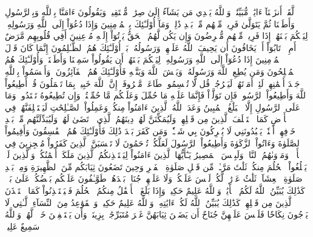 لَّقَدۡ أَنزَلۡنَآ ءَايَٰتٖ مُّبَيِّنَٰتٖۚ وَٱللَّهُ يَهۡدِي مَن يَشَآءُ إِلَىٰ صِرَٰطٖ مُّسۡتَقِيمٖ
وَيَقُولُونَ ءَامَنَّا بِٱللَّهِ وَبِٱلرَّسُولِ وَأَطَعۡنَا ثُمَّ يَتَوَلَّىٰ فَرِيقٞ مِّنۡهُم مِّنۢ بَعۡدِ ذَٰلِكَۚ وَمَآ أُوْلَـٰٓئِكَ بِٱلۡمُؤۡمِنِينَ
وَإِذَا دُعُوٓاْ إِلَى ٱللَّهِ وَرَسُولِهِۦ لِيَحۡكُمَ بَيۡنَهُمۡ إِذَا فَرِيقٞ مِّنۡهُم مُّعۡرِضُونَ
وَإِن يَكُن لَّهُمُ ٱلۡحَقُّ يَأۡتُوٓاْ إِلَيۡهِ مُذۡعِنِينَ
أَفِي قُلُوبِهِم مَّرَضٌ أَمِ ٱرۡتَابُوٓاْ أَمۡ يَخَافُونَ أَن يَحِيفَ ٱللَّهُ عَلَيۡهِمۡ وَرَسُولُهُۥۚ بَلۡ أُوْلَـٰٓئِكَ هُمُ ٱلظَّـٰلِمُونَ
إِنَّمَا كَانَ قَوۡلَ ٱلۡمُؤۡمِنِينَ إِذَا دُعُوٓاْ إِلَى ٱللَّهِ وَرَسُولِهِۦ لِيَحۡكُمَ بَيۡنَهُمۡ أَن يَقُولُواْ سَمِعۡنَا وَأَطَعۡنَاۚ وَأُوْلَـٰٓئِكَ هُمُ ٱلۡمُفۡلِحُونَ
وَمَن يُطِعِ ٱللَّهَ وَرَسُولَهُۥ وَيَخۡشَ ٱللَّهَ وَيَتَّقۡهِ فَأُوْلَـٰٓئِكَ هُمُ ٱلۡفَآئِزُونَ
۞وَأَقۡسَمُواْ بِٱللَّهِ جَهۡدَ أَيۡمَٰنِهِمۡ لَئِنۡ أَمَرۡتَهُمۡ لَيَخۡرُجُنَّۖ قُل لَّا تُقۡسِمُواْۖ طَاعَةٞ مَّعۡرُوفَةٌۚ إِنَّ ٱللَّهَ خَبِيرُۢ بِمَا تَعۡمَلُونَ
قُلۡ أَطِيعُواْ ٱللَّهَ وَأَطِيعُواْ ٱلرَّسُولَۖ فَإِن تَوَلَّوۡاْ فَإِنَّمَا عَلَيۡهِ مَا حُمِّلَ وَعَلَيۡكُم مَّا حُمِّلۡتُمۡۖ وَإِن تُطِيعُوهُ تَهۡتَدُواْۚ وَمَا عَلَى ٱلرَّسُولِ إِلَّا ٱلۡبَلَٰغُ ٱلۡمُبِينُ
وَعَدَ ٱللَّهُ ٱلَّذِينَ ءَامَنُواْ مِنكُمۡ وَعَمِلُواْ ٱلصَّـٰلِحَٰتِ لَيَسۡتَخۡلِفَنَّهُمۡ فِي ٱلۡأَرۡضِ كَمَا ٱسۡتَخۡلَفَ ٱلَّذِينَ مِن قَبۡلِهِمۡ وَلَيُمَكِّنَنَّ لَهُمۡ دِينَهُمُ ٱلَّذِي ٱرۡتَضَىٰ لَهُمۡ وَلَيُبَدِّلَنَّهُم مِّنۢ بَعۡدِ خَوۡفِهِمۡ أَمۡنٗاۚ يَعۡبُدُونَنِي لَا يُشۡرِكُونَ بِي شَيۡـٔٗاۚ وَمَن كَفَرَ بَعۡدَ ذَٰلِكَ فَأُوْلَـٰٓئِكَ هُمُ ٱلۡفَٰسِقُونَ
وَأَقِيمُواْ ٱلصَّلَوٰةَ وَءَاتُواْ ٱلزَّكَوٰةَ وَأَطِيعُواْ ٱلرَّسُولَ لَعَلَّكُمۡ تُرۡحَمُونَ
لَا تَحۡسَبَنَّ ٱلَّذِينَ كَفَرُواْ مُعۡجِزِينَ فِي ٱلۡأَرۡضِۚ وَمَأۡوَىٰهُمُ ٱلنَّارُۖ وَلَبِئۡسَ ٱلۡمَصِيرُ
يَـٰٓأَيُّهَا ٱلَّذِينَ ءَامَنُواْ لِيَسۡتَـٔۡذِنكُمُ ٱلَّذِينَ مَلَكَتۡ أَيۡمَٰنُكُمۡ وَٱلَّذِينَ لَمۡ يَبۡلُغُواْ ٱلۡحُلُمَ مِنكُمۡ ثَلَٰثَ مَرَّـٰتٖۚ مِّن قَبۡلِ صَلَوٰةِ ٱلۡفَجۡرِ وَحِينَ تَضَعُونَ ثِيَابَكُم مِّنَ ٱلظَّهِيرَةِ وَمِنۢ بَعۡدِ صَلَوٰةِ ٱلۡعِشَآءِۚ ثَلَٰثُ عَوۡرَٰتٖ لَّكُمۡۚ لَيۡسَ عَلَيۡكُمۡ وَلَا عَلَيۡهِمۡ جُنَاحُۢ بَعۡدَهُنَّۚ طَوَّـٰفُونَ عَلَيۡكُم بَعۡضُكُمۡ عَلَىٰ بَعۡضٖۚ كَذَٰلِكَ يُبَيِّنُ ٱللَّهُ لَكُمُ ٱلۡأٓيَٰتِۗ وَٱللَّهُ عَلِيمٌ حَكِيمٞ
وَإِذَا بَلَغَ ٱلۡأَطۡفَٰلُ مِنكُمُ ٱلۡحُلُمَ فَلۡيَسۡتَـٔۡذِنُواْ كَمَا ٱسۡتَـٔۡذَنَ ٱلَّذِينَ مِن قَبۡلِهِمۡۚ كَذَٰلِكَ يُبَيِّنُ ٱللَّهُ لَكُمۡ ءَايَٰتِهِۦۗ وَٱللَّهُ عَلِيمٌ حَكِيمٞ
وَٱلۡقَوَٰعِدُ مِنَ ٱلنِّسَآءِ ٱلَّـٰتِي لَا يَرۡجُونَ نِكَاحٗا فَلَيۡسَ عَلَيۡهِنَّ جُنَاحٌ أَن يَضَعۡنَ ثِيَابَهُنَّ غَيۡرَ مُتَبَرِّجَٰتِۭ بِزِينَةٖۖ وَأَن يَسۡتَعۡفِفۡنَ خَيۡرٞ لَّهُنَّۗ وَٱللَّهُ سَمِيعٌ عَلِيمٞ

